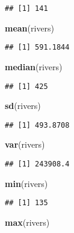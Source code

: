 \documentclass[
]{article}
\newenvironment{Shaded}{\begin{snugshade}}{\end{snugshade}}
\newcommand{\FunctionTok}[1]{\textcolor[rgb]{0.13,0.29,0.53}{\textbf{#1}}}
\newcommand{\NormalTok}[1]{#1}
\begin{document}
\begin{verbatim}
## [1] 141
\end{verbatim}

\begin{Shaded}
\begin{Highlighting}[]
\FunctionTok{mean}\NormalTok{(rivers)}
\end{Highlighting}
\end{Shaded}

\begin{verbatim}
## [1] 591.1844
\end{verbatim}

\begin{Shaded}
\begin{Highlighting}[]
\FunctionTok{median}\NormalTok{(rivers)}
\end{Highlighting}
\end{Shaded}

\begin{verbatim}
## [1] 425
\end{verbatim}

\begin{Shaded}
\begin{Highlighting}[]
\FunctionTok{sd}\NormalTok{(rivers)}
\end{Highlighting}
\end{Shaded}

\begin{verbatim}
## [1] 493.8708
\end{verbatim}

\begin{Shaded}
\begin{Highlighting}[]
\FunctionTok{var}\NormalTok{(rivers)}
\end{Highlighting}
\end{Shaded}

\begin{verbatim}
## [1] 243908.4
\end{verbatim}

\begin{Shaded}
\begin{Highlighting}[]
\FunctionTok{min}\NormalTok{(rivers)}
\end{Highlighting}
\end{Shaded}

\begin{verbatim}
## [1] 135
\end{verbatim}

\begin{Shaded}
\begin{Highlighting}[]
\FunctionTok{max}\NormalTok{(rivers)}
\end{Highlighting}
\end{Shaded}
\end{document}
